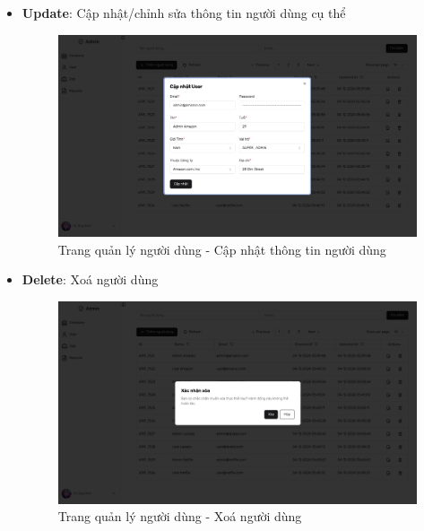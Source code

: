 \begin{itemize}
    \item \textbf{Update}: Cập nhật/chỉnh sửa thông tin người dùng cụ thể
    \begin{figure}[H]
        \centering
        \includegraphics[width=\linewidth]{DBMS-Application/Images/update-user.png}
        \caption{Trang quản lý người dùng - Cập nhật thông tin người dùng}
        \label{fig:enter-label}
    \end{figure}

    \item \textbf{Delete}: Xoá người dùng
    \begin{figure}[H]
        \centering
        \includegraphics[width=\linewidth]{DBMS-Application/Images/delete-user.png}
        \caption{Trang quản lý người dùng - Xoá người dùng}
        \label{fig:enter-label}
    \end{figure}
\end{itemize}